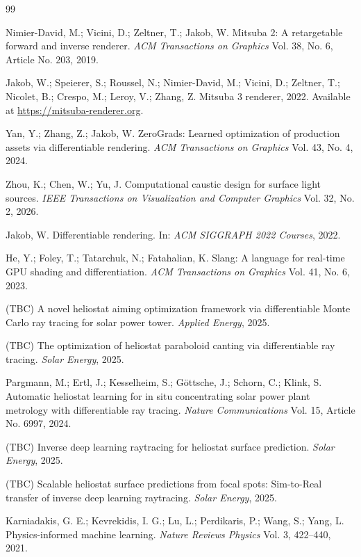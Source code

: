 \documentclass{CVM}
\begin{document}
\begin{thebibliography}{99}

Nimier-David, M.; Vicini, D.; Zeltner, T.; Jakob, W.
Mitsuba 2: A retargetable forward and inverse renderer.
\textit{ACM Transactions on Graphics} Vol. 38, No. 6, Article No. 203, 2019.

Jakob, W.; Speierer, S.; Roussel, N.; Nimier-David, M.; Vicini, D.;
Zeltner, T.; Nicolet, B.; Crespo, M.; Leroy, V.; Zhang, Z.
Mitsuba 3 renderer, 2022. Available at \url{https://mitsuba-renderer.org}.

Yan, Y.; Zhang, Z.; Jakob, W.
ZeroGrads: Learned optimization of production assets via differentiable
rendering. \textit{ACM Transactions on Graphics} Vol. 43, No. 4, 2024.

Zhou, K.; Chen, W.; Yu, J.
Computational caustic design for surface light sources.
\textit{IEEE Transactions on Visualization and Computer Graphics}
Vol. 32, No. 2, 2026.

Jakob, W.
Differentiable rendering. In: \textit{ACM SIGGRAPH 2022 Courses}, 2022.

He, Y.; Foley, T.; Tatarchuk, N.; Fatahalian, K.
Slang: A language for real-time GPU shading and differentiation.
\textit{ACM Transactions on Graphics} Vol. 41, No. 6, 2023.

(TBC) A novel heliostat aiming optimization framework via differentiable
Monte Carlo ray tracing for solar power tower.
\textit{Applied Energy}, 2025.

(TBC) The optimization of heliostat paraboloid canting via differentiable
ray tracing. \textit{Solar Energy}, 2025.

Pargmann, M.; Ertl, J.; Kesselheim, S.; G\"ottsche, J.; Schorn, C.;
Klink, S.
Automatic heliostat learning for in situ concentrating solar power plant
metrology with differentiable ray tracing.
\textit{Nature Communications} Vol. 15, Article No. 6997, 2024.

(TBC) Inverse deep learning raytracing for heliostat surface prediction.
\textit{Solar Energy}, 2025.

(TBC) Scalable heliostat surface predictions from focal spots: Sim-to-Real
transfer of inverse deep learning raytracing.
\textit{Solar Energy}, 2025.

Karniadakis, G. E.; Kevrekidis, I. G.; Lu, L.; Perdikaris, P.;
Wang, S.; Yang, L.
Physics-informed machine learning.
\textit{Nature Reviews Physics} Vol. 3, 422--440, 2021.


\end{thebibliography}
\end{document}
